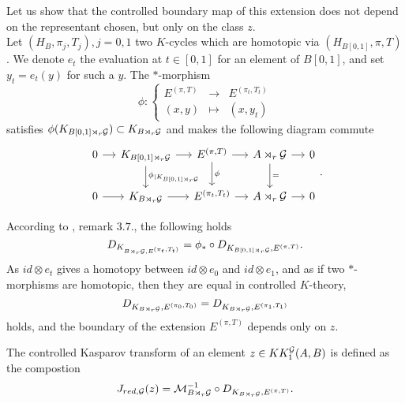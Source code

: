 Let us show that the controlled boundary map of this extension does not depend on the representant chosen, but only on the class $z$.\\
Let $(H_B, \pi_j,T_j), j=0,1$ two $K$-cycles which are homotopic via $(H_{B[0,1]},\pi,T)$. We denote $e_t$ the evaluation at $t\in[0,1]$ for an element of $B[0,1]$, and set $y_t=e_t(y)$ for such a $y$. The $*$-morphism
\[\phi : \left\{\begin{array}{lll}E^{(\pi,T)} & \rightarrow & E^{(\pi_t,T_t)} \\ (x,y) & \mapsto & (x, y_t)\end{array}\right.\]
satisfies $\phi(K_{B[0,1] \rtimes_r \mathcal G})\subset K_{B \rtimes_r \mathcal G}$ and makes the following diagram commute
\[\begin{tikzcd}[column sep = small]
0\arrow{r} & K_{B[0,1] \rtimes_r \G}\arrow{r}\arrow{d}{\phi_{|K_{B[0,1] \rtimes_r \G}}} & E^{(\pi,T)} \arrow{r}\arrow{d}{\phi} & A\rtimes_r \G \arrow{r}\arrow{d}{=}& 0 \\
0\arrow{r} & K_{B \rtimes_r \G}\arrow{r} &  E^{(\pi_t,T_t)} \arrow{r} & A\rtimes_r \G \arrow{r} & 0
\end{tikzcd}.\]

According to \cite{OY2}, remark $3.7.$, the following holds
\[D_{K_{B\rtimes_r\mathcal G,E^{(\pi_t,T_t)}}} = \phi_* \circ D_{K_{B[0,1]\rtimes_r\mathcal G},E^{(\pi,T)}}.\]
As $id \otimes e_t$ gives a homotopy between $id\otimes e_0$ and $id\otimes e_1$, and as if two $*$-morphisms are homotopic, then they are equal in controlled $K$-theory, 
\[D_{K_{B\rtimes_r \mathcal G}, E^{(\pi_0,T_0)}}=D_{K_{B\rtimes_r \mathcal G}, E^{(\pi_1,T_1)}}\]
holds, and the boundary of the extension $E^{(\pi,T)}$ depends only on $z$.\\

\begin{definition}
The controlled Kasparov transform of an element $z\in KK_1^\mathcal G(A,B)$ is defined as the compostion
\[J_{red,\mathcal G}(z)=\mathcal M_{B\rtimes_r \mathcal G}^{-1}\circ D_{K_{B\rtimes_r \mathcal G}, E^{(\pi,T)}}.\]
\end{definition}


